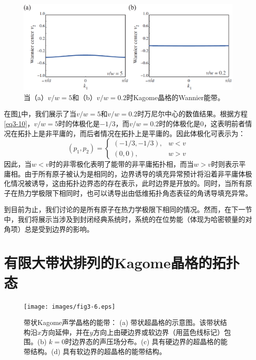 \begin{figure}[h!]
  \centering
  \includegraphics[width=1\textwidth]{images/fig3-5.eps} 
  \caption{当（a）\(v/w = 5\)和（b）\(v/w = 0.2\)时Kagome晶格的Wannier能带。
  }
  \label{fig_3_5}
\end{figure}

在图\ref{fig_3_5}中，我们展示了当\(v/w = 5\)和\(v/w = 0.2\)时万尼尔中心的数值结果。根据方程\ref{eq3-10}，\(v/w = 5\)时的体极化是\(-1/3\)，而\(v/w = 0.2\)时的体极化是\(0\)，这表明前者情况在拓扑上是非平庸的，而后者情况在拓扑上是平庸的。因此体极化可表示为：
\begin{equation} \label{eq3-11}
  (p_1,p_2) = 
  \begin{cases}
  (-1/3,-1/3), & w < v \\
  (0,0), & w > v
  \end{cases}
\end{equation}
因此，当$w < v$时的非零极化表明了能带的非平庸拓扑相，而当$w > v$时则表示平庸相。由于所有原子被认为是相同的，边界诱导的填充异常预计将沿着非平庸体极化情况被诱导，这由拓扑边界态的存在表示，此时边界是开放的。同时，当所有原子在热力学极限下相同时，也可以诱导出由低维拓扑角态表征的角诱导填充异常\cite{C3-3}。

到目前为止，我们讨论的是所有原子在热力学极限下相同的情况。然而，在下一节中，我们将展示当涉及到封闭经典系统时，系统的在位势能（体现为哈密顿量的对角项）总是受到边界的影响。

\section{有限大带状排列的Kagome晶格的拓扑态}

\begin{figure}[h!]
  \centering
  \texttt{[image: images/fig3-6.eps]} 
  \caption{带状Kagome声学晶格的能带：
  (a) 带状超晶格的示意图。该带状结构沿$x$方向延伸，并在$y$方向上由硬边界或软边界（用蓝色线标记）包围。(b) $k = 0$时边界态的声压场分布。(c) 具有硬边界的超晶格的能带结构。(d) 具有软边界的超晶格的能带结构。
  }
  \label{fig_3_6}
\end{figure}

